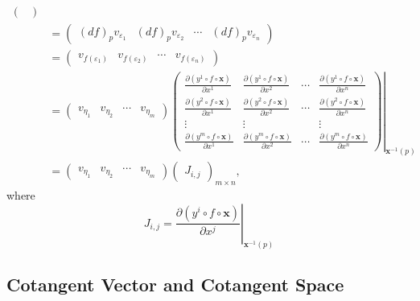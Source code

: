 \documentclass{report}
\begin{document}
{\[\begin{aligned}
\begin{pmatrix}
            \end{pmatrix}\\
            &=
            \begin{pmatrix}
            (df)_pv_{\varepsilon_1}&(df)_pv_{\varepsilon_2}&\cdots&(df)_pv_{\varepsilon_n}
            \end{pmatrix}\\
            &=
            \begin{pmatrix}
            v_{f(\varepsilon_1)}&v_{f(\varepsilon_2)}&\cdots&v_{f(\varepsilon_n)}
            \end{pmatrix}\\
            &=
            \begin{pmatrix}
            v_{\eta_1}&v_{\eta_2}&\cdots&v_{\eta_m}
            \end{pmatrix}
            \left.\begin{pmatrix}
                \frac{\partial(y^1 \circ f\circ\mathbf{x})}{\partial x^1}&\frac{\partial(y^1 \circ f\circ\mathbf{x})}{\partial x^2}&\cdots&\frac{\partial(y^1 \circ f\circ\mathbf{x})}{\partial x^n}\\
                \frac{\partial(y^2 \circ f\circ\mathbf{x})}{\partial x^1}&\frac{\partial(y^2 \circ f\circ\mathbf{x})}{\partial x^2}&\cdots&\frac{\partial(y^2 \circ f\circ\mathbf{x})}{\partial x^n}\\
                \vdots&\vdots&&\vdots\\
                \frac{\partial(y^m \circ f\circ\mathbf{x})}{\partial x^1}&\frac{\partial(y^m \circ f\circ\mathbf{x})}{\partial x^2}&\cdots&\frac{\partial(y^m \circ f\circ\mathbf{x})}{\partial x^n}
            \end{pmatrix}\right|_{\mathbf{x}^{-1}(p)}\\
            &=
            \begin{pmatrix}
            v_{\eta_1}&v_{\eta_2}&\cdots&v_{\eta_m}
            \end{pmatrix}
            \begin{pmatrix}
           J_{i,j}
           \end{pmatrix}_{m\times n},
        \end{aligned}
    \]
    where
    \[
        J_{i,j}=\left.\frac{\partial(y^i \circ f\circ\mathbf{x})}{\partial x^j}\right|_{\mathbf{x}^{-1}(p)}
        \]
}

\subsection{Cotangent Vector and Cotangent Space}
\end{document}
